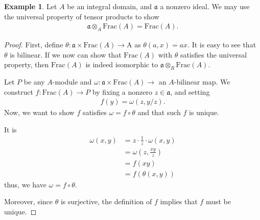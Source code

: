 \documentclass[a4paper]{book}
\theoremstyle{definition}
\newtheorem{example}{Example}[definition]
\begin{document}
\begin{example}
    Let \(A\) be an integral domain, and \(\mathfrak{a}\) a nonzero ideal. We may use the universal property of tensor products to show
    \begin{align*}
        \mathfrak{a} \otimes_A \mathrm{Frac}(A) = \mathrm{Frac}(A) \text{.}
    \end{align*}
\end{example}
\begin{proof}
    First, define \(\theta: \mathfrak{a} \times \mathrm{Frac}(A) \rightarrow \mathrm{A}\) as \(\theta(a, x) = ax\). It is easy to see that \(\theta\) is bilinear. If we now can show that \(\mathrm{Frac}(A)\) with \(\theta\) satisfies the universal property, then \(\mathrm{Frac}(A)\) is indeed isomorphic to \(\mathfrak{a} \otimes_R \mathrm{Frac}(A)\).

    Let \(P\) be any \(A\)-module and \(\omega: \mathfrak{a} \times \mathrm{Frac}(A) \rightarrow\) an \(A\)-bilinear map. We construct \(f: \mathrm{Frac}(A) \rightarrow P\) by fixing a nonzero \(z \in \mathfrak{a}\), and setting
    \begin{align*}
        f(y) = \omega(z, y/z) \text{.}
    \end{align*}
    Now, we want to show \(f\) satisfies \(\omega = f \circ \theta\) and that such \(f\) is unique.

    It is
    \begin{align*}
        \omega(x, y) &= z \cdot \frac{1}{z} \cdot \omega(x, y) \\
        &= \omega(z, \frac{xy}{z}) \\
        &= f(xy) \\
        &= f(\theta(x, y))
    \end{align*}
    thus, we have \(\omega = f \circ \theta\).

    Moreover, since \(\theta\) is surjective, the definition of \(f\) implies that \(f\) must be unique.
\end{proof}
\end{document}

